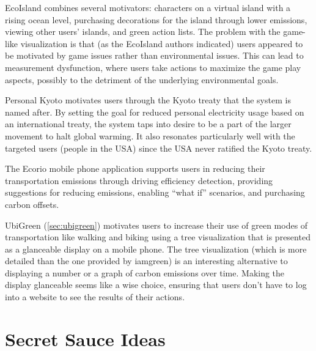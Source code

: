 EcoIsland combines several motivators: characters on a virtual island with a rising ocean level, purchasing decorations for the island through lower emissions, viewing other users' islands, and green action lists. The problem with the game-like visualization is that (as the EcoIsland authors indicated) users appeared to be motivated by game issues rather than environmental issues. This can lead to measurement dysfunction, where users take actions to maximize the game play aspects, possibly to the detriment of the underlying environmental goals.

Personal Kyoto motivates users through the Kyoto treaty that the system is named after. By setting the goal for reduced personal electricity usage based on an international treaty, the system taps into desire to be a part of the larger movement to halt global warming. It also resonates particularly well with the targeted users (people in the USA) since the USA never ratified the Kyoto treaty.

The Ecorio mobile phone application supports users in reducing their transportation emissions through driving efficiency detection, providing suggestions for reducing emissions, enabling ``what if'' scenarios, and purchasing carbon offsets.

UbiGreen (\autoref{sec:ubigreen}) motivates users to increase their use of green modes of transportation like walking and biking using a tree visualization that is presented as a glanceable display on a mobile phone. The tree visualization (which is more detailed than the one provided by iamgreen) is an interesting alternative to displaying a number or a graph of carbon emissions over time. Making the display glanceable seems like a wise choice, ensuring that users don't have to log into a website to see the results of their actions.

\section{Secret Sauce Ideas}

